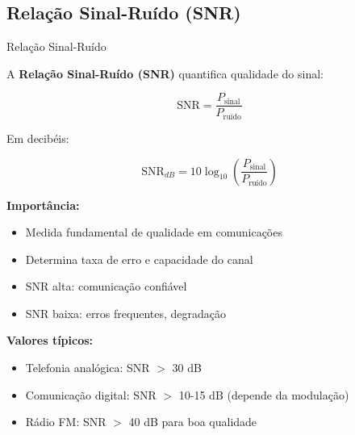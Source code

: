 
\subsection{Relação Sinal-Ruído (SNR)}

\begin{frame}{Relação Sinal-Ruído}

A \textbf{Relação Sinal-Ruído (SNR)} quantifica qualidade do sinal:

\[
\text{SNR} = \frac{P_{\text{sinal}}}{P_{\text{ruído}}}
\]

Em decibéis:

\[
\text{SNR}_{dB} = 10\log_{10}\left(\frac{P_{\text{sinal}}}{P_{\text{ruído}}}\right)
\]

\vspace{0.1cm}

\textbf{Importância:}

\begin{itemize}
\item Medida fundamental de qualidade em comunicações
\item Determina taxa de erro e capacidade do canal
\item SNR alta: comunicação confiável
\item SNR baixa: erros frequentes, degradação
\end{itemize}

\vspace{0.1cm}

\textbf{Valores típicos:}

\begin{itemize}
\item Telefonia analógica: SNR $>$ 30 dB
\item Comunicação digital: SNR $>$ 10-15 dB (depende da modulação)
\item Rádio FM: SNR $>$ 40 dB para boa qualidade
\end{itemize}

\end{frame}


